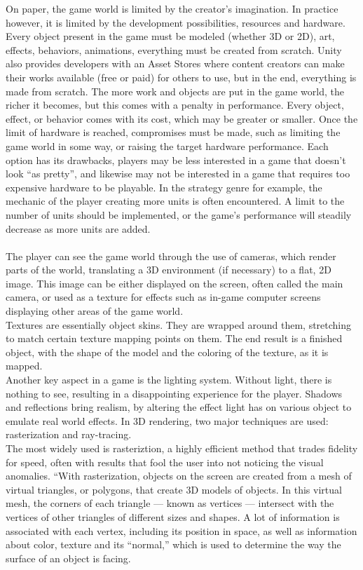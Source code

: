 On paper, the game world is limited by the creator's imagination. In practice however, it is limited by the development possibilities, resources and hardware. Every object present in the game must be modeled (whether 3D or 2D), art, effects, behaviors, animations, everything must be created from scratch. Unity also provides developers with an Asset Stores where content creators can make their works available (free or paid) for others to use, but in the end, everything is made from scratch. The more work and objects are put in the game world, the richer it becomes, but this comes with a penalty in performance. Every object, effect, or behavior comes with its cost, which may be greater or smaller. Once the limit of hardware is reached, compromises must be made, such as limiting the game world in some way, or raising the target hardware performance. Each option has its drawbacks, players may be less interested in a game that doesn't look ``as pretty'', and likewise may not be interested in a game that requires too expensive hardware to be playable. In the strategy genre for example, the mechanic of the player creating more units is often encountered. A limit to the number of units should be implemented, or the game's performance will steadily decrease as more units are added.\\ \\
The player can see the game world through the use of cameras, which render parts of the world, translating a 3D environment (if necessary) to a flat, 2D image. This image can be either displayed on the screen, often called the main camera, or used as a texture for effects such as in-game computer screens displaying other areas of the game world.\\
Textures are essentially object skins. They are wrapped around them, stretching to match certain texture mapping points on them. The end result is a finished object, with the shape of the model and the coloring of the texture, as it is mapped.\\
Another key aspect in a game is the lighting system. Without light, there is nothing to see, resulting in a disappointing experience for the player. Shadows and reflections bring realism, by altering the effect light has on various object to emulate real world effects. In 3D rendering, two major techniques are used: rasterization and ray-tracing. \\
The most widely used is rasteriztion, a highly efficient method that trades fidelity for speed, often with results that fool the user into not noticing the visual anomalies. ``With rasterization, objects on the screen are created from a mesh of virtual triangles, or polygons, that create 3D models of objects. In this virtual mesh, the corners of each triangle — known as vertices — intersect with the vertices of other triangles of different sizes and shapes. A lot of information is associated with each vertex, including its position in space, as well as information about color, texture and its “normal,” which is used to determine the way the surface of an object is facing.
